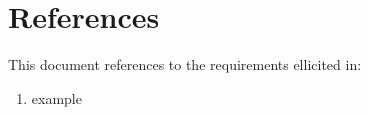 \section{References}
This document references to the requirements ellicited in:
\begin{enumerate}
\item example
\end{enumerate}
